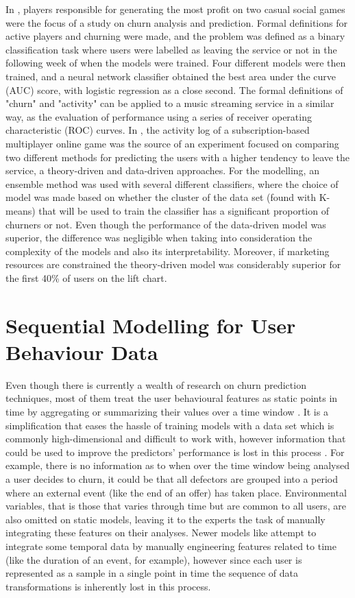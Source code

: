 \documentclass{kththesis}
\begin{document}
In \citep{Runge2014}, players responsible for generating the most profit on two casual social games were the focus of a study on churn analysis and prediction. Formal definitions for active players and churning were made, and the problem was defined as a binary classification task where users were labelled as leaving the service or not in the following week of when the models were trained. Four different models were then trained, and a neural network classifier obtained the best area under the curve (AUC) score, with logistic regression as a close second. The formal definitions of "churn" and "activity" can be applied to a music streaming service in a similar way, as the evaluation of performance using a series of receiver operating characteristic (ROC) curves. In \citep{Borbora2011}, the activity log of a subscription-based multiplayer online game was the source of an experiment focused on comparing two different methods for predicting the users with a higher tendency to leave the service, a theory-driven and data-driven approaches. For the modelling, an ensemble method was used with several different classifiers, where the choice of model was made based on whether the cluster of the data set (found with K-means) that will be used to train the classifier has a significant proportion of churners or not. Even though the performance of the data-driven model was superior, the difference was negligible when taking into consideration the complexity of the models and also its interpretability. Moreover, if marketing resources are constrained the theory-driven model was considerably superior for the first 40\% of users on the lift chart. 


\section{Sequential Modelling for User Behaviour Data}

Even though there is currently a wealth of research on churn prediction techniques, most of them treat the user behavioural features as static points in time by aggregating or summarizing their values over a time window \citep{Auon2015}. It is a simplification that eases the hassle of training models with a data set which is commonly high-dimensional and difficult to work with, however information that could be used to improve the predictors' performance is lost in this process  \citep{GurAli2014}. For example, there is no information as to when over the time window being analysed a user decides to churn, it could be that all defectors are grouped into a period where an external event (like the end of an offer) has taken place. Environmental variables, that is those that varies through time but are common to all users, are also omitted on static models, leaving it to the experts the task of manually integrating these features on their analyses. Newer models like \citep{Pudipeddi2014} attempt to integrate some temporal data by manually engineering features related to time (like the duration of an event, for example), however since each user is represented as a sample in a single point in time the sequence of data transformations is inherently lost in this process.
\end{document}
